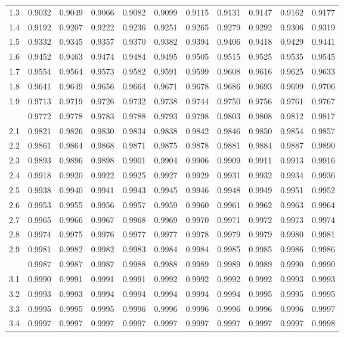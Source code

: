 \documentclass[a4paper]{article}
\theoremstyle{break}
\begin{document}
\begin{table}[H]
\begin{scriptsize}
\begin{tabular}{*{11}{r}}
1.3 & 0.9032 & 0.9049 & 0.9066 & 0.9082 & 0.9099 & 0.9115 & 0.9131 & 0.9147 & 0.9162 & 0.9177\\
1.4 & 0.9192 & 0.9207 & 0.9222 & 0.9236 & 0.9251 & 0.9265 & 0.9279 & 0.9292 & 0.9306 & 0.9319\\
1.5 & 0.9332 & 0.9345 & 0.9357 & 0.9370 & 0.9382 & 0.9394 & 0.9406 & 0.9418 & 0.9429 & 0.9441\\
1.6 & 0.9452 & 0.9463 & 0.9474 & 0.9484 & 0.9495 & 0.9505 & 0.9515 & 0.9525 & 0.9535 & 0.9545\\
1.7 & 0.9554 & 0.9564 & 0.9573 & 0.9582 & 0.9591 & 0.9599 & 0.9608 & 0.9616 & 0.9625 & 0.9633\\
1.8 & 0.9641 & 0.9649 & 0.9656 & 0.9664 & 0.9671 & 0.9678 & 0.9686 & 0.9693 & 0.9699 & 0.9706\\
1.9 & 0.9713 & 0.9719 & 0.9726 & 0.9732 & 0.9738 & 0.9744 & 0.9750 & 0.9756 & 0.9761 & 0.9767\\
\addlinespace
2.0 & 0.9772 & 0.9778 & 0.9783 & 0.9788 & 0.9793 & 0.9798 & 0.9803 & 0.9808 & 0.9812 & 0.9817\\
2.1 & 0.9821 & 0.9826 & 0.9830 & 0.9834 & 0.9838 & 0.9842 & 0.9846 & 0.9850 & 0.9854 & 0.9857\\
2.2 & 0.9861 & 0.9864 & 0.9868 & 0.9871 & 0.9875 & 0.9878 & 0.9881 & 0.9884 & 0.9887 & 0.9890\\
2.3 & 0.9893 & 0.9896 & 0.9898 & 0.9901 & 0.9904 & 0.9906 & 0.9909 & 0.9911 & 0.9913 & 0.9916\\
2.4 & 0.9918 & 0.9920 & 0.9922 & 0.9925 & 0.9927 & 0.9929 & 0.9931 & 0.9932 & 0.9934 & 0.9936\\
2.5 & 0.9938 & 0.9940 & 0.9941 & 0.9943 & 0.9945 & 0.9946 & 0.9948 & 0.9949 & 0.9951 & 0.9952\\
2.6 & 0.9953 & 0.9955 & 0.9956 & 0.9957 & 0.9959 & 0.9960 & 0.9961 & 0.9962 & 0.9963 & 0.9964\\
2.7 & 0.9965 & 0.9966 & 0.9967 & 0.9968 & 0.9969 & 0.9970 & 0.9971 & 0.9972 & 0.9973 & 0.9974\\
2.8 & 0.9974 & 0.9975 & 0.9976 & 0.9977 & 0.9977 & 0.9978 & 0.9979 & 0.9979 & 0.9980 & 0.9981\\
2.9 & 0.9981 & 0.9982 & 0.9982 & 0.9983 & 0.9984 & 0.9984 & 0.9985 & 0.9985 & 0.9986 & 0.9986\\
\addlinespace
3.0 & 0.9987 & 0.9987 & 0.9987 & 0.9988 & 0.9988 & 0.9989 & 0.9989 & 0.9989 & 0.9990 & 0.9990\\
3.1 & 0.9990 & 0.9991 & 0.9991 & 0.9991 & 0.9992 & 0.9992 & 0.9992 & 0.9992 & 0.9993 & 0.9993\\
3.2 & 0.9993 & 0.9993 & 0.9994 & 0.9994 & 0.9994 & 0.9994 & 0.9994 & 0.9995 & 0.9995 & 0.9995\\
3.3 & 0.9995 & 0.9995 & 0.9995 & 0.9996 & 0.9996 & 0.9996 & 0.9996 & 0.9996 & 0.9996 & 0.9997\\
3.4 & 0.9997 & 0.9997 & 0.9997 & 0.9997 & 0.9997 & 0.9997 & 0.9997 & 0.9997 & 0.9997 & 0.9998\\
\bottomrule
\end{tabular}
\end{scriptsize}


\end{table}
\end{document}
